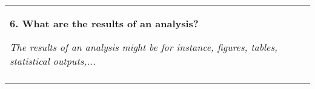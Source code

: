 \documentclass[12pt]{article}
\begin{document}


\newpage



\begin{table}[H]
 			\centering
\begin{tabular}{p{5.99in}}
\hline
\multicolumn{1}{|p{5.99in}|}{\textbf{6. What are the results of an analysis?}
\par \textit{{The results of an analysis might be for instance, figures, tables, statistical outputs,...}}} \\
\hhline{-}
\end{tabular}
\end{table}

\end{document}
